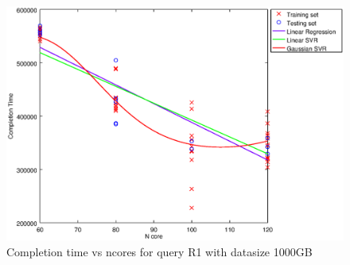 
\begin {figure}[hbtp]
\centering
\includegraphics[width=\textwidth]{output/R1_1000_ONLY_1_LINEAR_NCORE/plot_R1_1000_bestmodels.eps}
\caption{Completion time vs ncores for query R1 with datasize 1000GB}
\label{fig:only_1_linear_R1_1000}
\end {figure}
